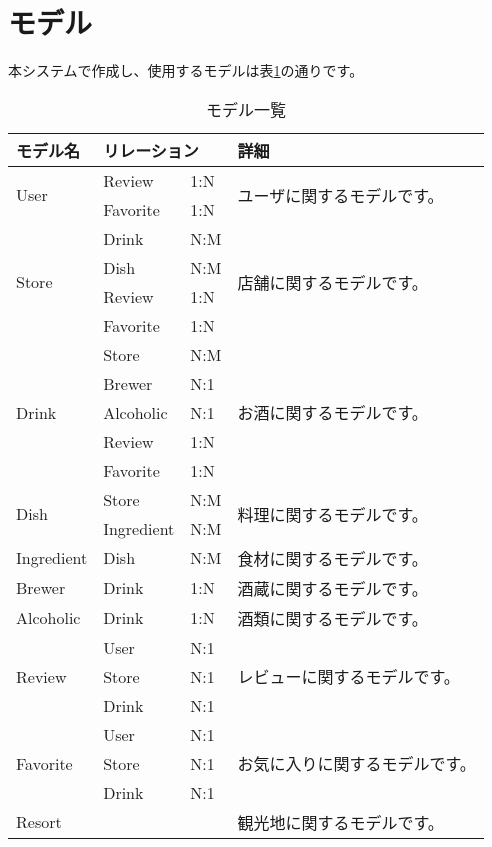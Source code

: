 \documentclass[a4j,titlepage]{jarticle}
\begin{document}
\section{モデル}

本システムで作成し、使用するモデルは表\ref{model}の通りです。

\begin{table}[!htbp]
\caption{モデル一覧}
\label{model}
\small
\begin{center}
\begin{tabular}{|l|l|l|p{5cm}|}\hline
モデル名 & \multicolumn{2}{|l|}{リレーション} & 詳細 \\\hline\hline
\multirow{2}{*}{User} & Review & 1:N & \multirow{2}{*}{ユーザに関するモデルです。}\\\cline{2-3}
 & Favorite & 1:N & \\\hline
\multirow{4}{*}{Store} & Drink & N:M & \multirow{4}{*}{店舗に関するモデルです。} \\\cline{2-3}
 & Dish & N:M & \\\cline{2-3}
 & Review & 1:N & \\\cline{2-3}
 & Favorite & 1:N & \\\hline
\multirow{5}{*}{Drink} & Store & N:M & \multirow{5}{*}{お酒に関するモデルです。} \\\cline{2-3}
 & Brewer & N:1 & \\\cline{2-3}
 & Alcoholic & N:1 & \\\cline{2-3}
 & Review & 1:N & \\\cline{2-3}
 & Favorite & 1:N & \\\hline
\multirow{2}{*}{Dish} & Store & N:M & \multirow{2}{*}{料理に関するモデルです。} \\\cline{2-3}
 & Ingredient & N:M & \\\hline
Ingredient & Dish & N:M & 食材に関するモデルです。 \\\hline
Brewer & Drink & 1:N & 酒蔵に関するモデルです。 \\\hline
Alcoholic & Drink & 1:N & 酒類に関するモデルです。 \\\hline
\multirow{3}{*}{Review} & User & N:1 & \multirow{3}{*}{レビューに関するモデルです。} \\\cline{2-3}
 & Store & N:1 & \\\cline{2-3}
 & Drink & N:1 & \\\hline
\multirow{3}{*}{Favorite} & User & N:1 & \multirow{3}{*}{お気に入りに関するモデルです。} \\\cline{2-3}
 & Store & N:1 & \\\cline{2-3}
 & Drink & N:1 & \\\hline
Resort & & & 観光地に関するモデルです。 \\\hline
\end{tabular}
\end{center}
\end{table}
\end{document}
